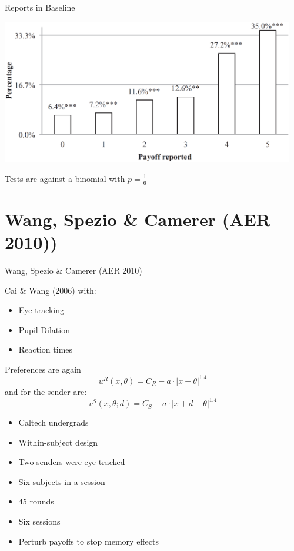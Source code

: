 \documentclass{beamer}
\begin{document}
\begin{frame}{Reports in Baseline}
\begin{card}
	\begin{center}\includegraphics[width=0.96\textwidth]{./i/ffh2013fig1.eps}\end{center}
\end{card}
	
\begin{card}Tests are against a binomial with $p=\frac{1}{6}$\end{card}
\end{frame}

\section{Wang, Spezio \& Camerer (AER 2010))}
\begin{frame}{Wang, Spezio \& Camerer (AER 2010)}
	\begin{card}
		Cai \& Wang (2006) with:
		\begin{itemize}
			\item Eye-tracking
			\item Pupil Dilation
			\item Reaction times
		\end{itemize}
		Preferences are again 
				$$u^R(x,\theta)=C_R-a\cdot \left|x-\theta\right|^{1.4}$$
				and for the sender are:
				$$v^S(x,\theta;d)=C_S-a\cdot \left|x+d-\theta\right|^{1.4}$$
	\end{card}
\end{frame}

\begin{frame}
\begin{card}
	\begin{itemize}
		\item Caltech undergrads
		\item Within-subject design
		\item Two senders were eye-tracked
		\item Six subjects in a session
		\item 45 rounds
		\item Six sessions 
		\item Perturb payoffs to stop memory effects
	\end{itemize}
	\end{card}
\end{frame}
\end{document}
